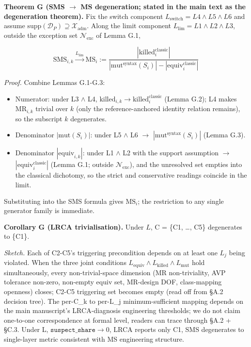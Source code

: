 \documentclass[manuscript,screen,review]{acmart}
\begin{document}
\textbf{Theorem G (SMS $\to$ MS degeneration; stated in the main text
as the degeneration theorem).} Fix the switch component
$L_{\mathrm{switch}} = L4 \wedge L5 \wedge L6$ and assume
$\mathrm{supp}(\mathcal{D}_P) \supseteq \mathcal{X}_{\mathrm{adm}}$.
Along the limit component $L_{\mathrm{lim}} = L1 \wedge L2 \wedge L3$,
outside the exception set $\mathcal{N}_{\mathrm{exc}}$ of Lemma G.1,

\[ \mathrm{SMS}_{i,k} \xrightarrow{L_{\mathrm{lim}}} \mathrm{MS}_{i} := \frac{|\mathrm{killed}_{i}^{\mathrm{classic}}|}{|\mathrm{mut}^{\mathrm{syntax}}(S_i)| - |\mathrm{equiv}_{i}^{\mathrm{classic}}|} \]

\emph{Proof.} Combine Lemmas G.1-G.3:

\begin{itemize}

\item
  Numerator: under L3 $\wedge$ L4, $\mathrm{killed}_{i,k} \to
  \mathrm{killed}_{i}^{\mathrm{classic}}$ (Lemma G.2); L4 makes $\mathrm{MR}_{i,k}$ trivial
  over $k$ (only the reference-anchored identity relation remains), so
  the subscript $k$ degenerates.
\item
  Denominator $|\mathrm{mut}(S_i)|$: under L5 $\wedge$ L6 $\to$
  $|\mathrm{mut}^{\mathrm{syntax}}(S_i)|$ (Lemma G.3).
\item
  Denominator $|\mathrm{equiv}_{i,k}|$: under L1 $\wedge$ L2 with the
  support assumption $\to$
  $|\mathrm{equiv}_{i}^{\mathrm{classic}}|$ (Lemma G.1;
  outside $\mathcal{N}_{\mathrm{exc}}$), and the unresolved set empties
  into the classical dichotomy, so the strict and conservative readings
  coincide in the limit.
\end{itemize}

Substituting into the SMS formula gives $\mathrm{MS}_{i}$; the
restriction to any single generator family is immediate.

\textbf{Corollary G (LRCA trivialisation).} Under $L$, C
= \{C1, \ldots, C5\} degenerates to \{C1\}.

\emph{Sketch.} Each of C2-C5's triggering precondition depends on at
least one $L_j$ being violated. When the three joint conditions
$L_{\mathrm{equiv}} \wedge L_{\mathrm{killed}} \wedge L_{\mathrm{mut}}$
hold simultaneously,
every non-trivial-space dimension (MR non-triviality, AVP tolerance
non-zero, non-empty equiv set, MR-design DOF, class-mapping openness)
closes; C2-C5 triggering set becomes empty (read off from §A.2 decision
tree). The per-C\_k to per-L\_j minimum-sufficient mapping depends on
the main manuscript's LRCA-diagnosis engineering thresholds; we do not claim one-to-one
correspondence at formal level, readers can trace through §A.2 + §C.3.
Under L, $\texttt{suspect\_share} \to 0$, LRCA reports only C1, SMS degenerates to
single-layer metric consistent with \citet{d7c38286734419b52de4262c9802ebdfcf4b9447} MS engineering
structure.
\end{document}
